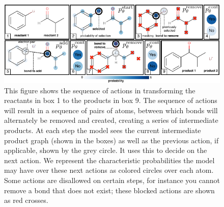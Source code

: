 \begin{figure}
\centering
\includegraphics[width=\textwidth]{reaction_model_blue}
\caption{
 This figure shows the sequence of actions in transforming the reactants in box 1 to the products in box 9.
 The sequence of actions will result in a sequence of pairs of atoms, between which bonds will alternately be removed and created, creating a series of intermediate products. 
At each step the model sees the current intermediate product graph (shown in the boxes) as well as the previous action, if applicable, shown by the grey circle. It uses this to decide on the next action.
We represent the characteristic probabilities the model may have over these next actions as colored circles over each atom.
Some actions are disallowed on certain steps, for instance you cannot remove a bond that does not exist; these blocked actions are shown as red crosses.
}
\label{fig:reaction_model}
\end{figure}







